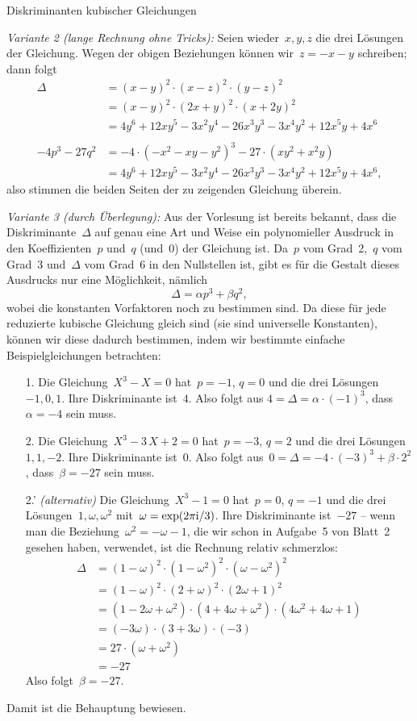 \documentclass{algblatt}
\begin{document}
\begin{aufgabe}{Diskriminanten kubischer Gleichungen}
\begin{loesungE}
\emph{Variante 2 (lange Rechnung ohne Tricks):} Seien wieder~$x,y,z$ die drei
Lösungen der Gleichung. Wegen der obigen Beziehungen können wir~$z = -x-y$
schreiben; dann folgt
\begin{align*}
  \Delta &= (x-y)^2 \cdot (x-z)^2 \cdot (y-z)^2 \\
  &= (x-y)^2 \cdot (2x + y)^2 \cdot (x + 2y)^2 \\
  &= 4y^6+12xy^5-3x^2y^4-26x^3y^3-3x^4y^2+12x^5y+4x^6 \\
  \\
  -4p^3 - 27q^2 &= -4 \cdot (-x^2 - xy - y^2)^3 - 27 \cdot (xy^2 + x^2y) \\
  &= 4y^6+12xy^5-3x^2y^4-26x^3y^3-3x^4y^2+12x^5y+4x^6,
\end{align*}
also stimmen die beiden Seiten der zu zeigenden Gleichung überein.

\emph{Variante 3 (durch Überlegung):} Aus der Vorlesung ist bereits bekannt,
dass die Diskriminante~$\Delta$ auf genau eine Art und Weise ein polynomieller
Ausdruck in den Koeffizienten~$p$ und~$q$ (und~$0$) der Gleichung ist. Da~$p$
vom Grad~2,~$q$ vom Grad~3 und~$\Delta$ vom Grad~6 in den Nullstellen ist, gibt
es für die Gestalt dieses Ausdrucks nur eine Möglichkeit, nämlich
\[ \Delta = \alpha p^3 + \beta q^2, \]
wobei die konstanten Vorfaktoren noch zu bestimmen sind. Da diese für jede
reduzierte kubische Gleichung gleich sind (sie sind universelle Konstanten),
können wir diese dadurch bestimmen, indem wir bestimmte einfache
Beispielgleichungen betrachten:
\begin{enumerate}
\item[1.] Die Gleichung~$X^3 - X = 0$ hat~$p = -1$, $q = 0$ und die drei
Lösungen~$-1, 0, 1$. Ihre Diskriminante ist~$4$. Also folgt aus
$4 = \Delta = \alpha \cdot (-1)^3$,
dass~$\alpha = -4$ sein muss.
\item[2.] Die Gleichung~$X^3 - 3\,X + 2 = 0$ hat~$p = -3$, $q = 2$ und die drei
Lösungen~$1, 1, -2$. Ihre Diskriminante ist~$0$. Also folgt aus~$0 = \Delta =
-4 \cdot (-3)^3 + \beta \cdot 2^2$, dass~$\beta = -27$ sein muss.
\item[2.'] \emph{(alternativ)}
Die Gleichung~$X^3 - 1 = 0$ hat~$p = 0$, $q = -1$ und die drei
Lösungen~$1, \omega, \omega^2$ mit~$\omega = \exp(2\pi\mathrm{i}/3)$. Ihre
Diskriminante ist~$-27$ -- wenn man die Beziehung~$\omega^2 = -\omega - 1$, die
wir schon in Aufgabe~5 von Blatt~2 gesehen haben, verwendet, ist die Rechnung
relativ schmerzlos:
\begin{align*}
  \Delta &= (1-\omega)^2 \cdot (1-\omega^2)^2 \cdot (\omega-\omega^2)^2 \\
  &= (1-\omega)^2 \cdot (2+\omega)^2 \cdot (2\omega+1)^2 \\
  &= (1-2\omega+\omega^2) \cdot (4+4\omega+\omega^2) \cdot (4\omega^2+4\omega+1) \\
  &= (-3\omega) \cdot (3+3\omega) \cdot (-3) \\
  &= 27 \cdot (\omega+\omega^2) \\
  &= -27
\end{align*}
Also folgt~$\beta = -27$.
\end{enumerate}
Damit ist die Behauptung bewiesen.


\end{loesungE}
\end{aufgabe}
\end{document}
